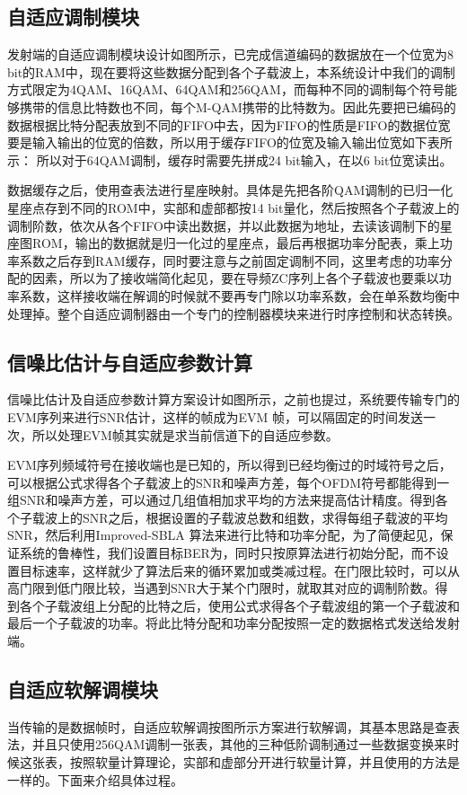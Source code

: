 \subsection{自适应调制模块}
发射端的自适应调制模块设计如图所示，已完成信道编码的数据放在一个位宽为8 bit的RAM中，现在要将这些数据分配到各个子载波上，本系统设计中我们的调制方式限定为4QAM、16QAM、64QAM和256QAM，而每种不同的调制每个符号能够携带的信息比特数也不同，每个M-QAM携带的比特数为。因此先要把已编码的数据根据比特分配表放到不同的FIFO中去，因为FIFO的性质是FIFO的数据位宽要是输入输出的位宽的倍数，所以用于缓存FIFO的位宽及输入输出位宽如下表所示：
所以对于64QAM调制，缓存时需要先拼成24 bit输入，在以6 bit位宽读出。

数据缓存之后，使用查表法进行星座映射。具体是先把各阶QAM调制的已归一化星座点存到不同的ROM中，实部和虚部都按14 bit量化，然后按照各个子载波上的调制阶数，依次从各个FIFO中读出数据，并以此数据为地址，去读该调制下的星座图ROM，输出的数据就是归一化过的星座点，最后再根据功率分配表，乘上功率系数之后存到RAM缓存，同时要注意与之前固定调制不同，这里考虑的功率分配的因素，所以为了接收端简化起见，要在导频ZC序列上各个子载波也要乘以功率系数，这样接收端在解调的时候就不要再专门除以功率系数，会在单系数均衡中处理掉。整个自适应调制器由一个专门的控制器模块来进行时序控制和状态转换。

\subsection{信噪比估计与自适应参数计算}
信噪比估计及自适应参数计算方案设计如图所示，之前也提过，系统要传输专门的EVM序列来进行SNR估计，这样的帧成为EVM 帧，可以隔固定的时间发送一次，所以处理EVM帧其实就是求当前信道下的自适应参数。

EVM序列频域符号在接收端也是已知的，所以得到已经均衡过的时域符号之后，可以根据公式求得各个子载波上的SNR和噪声方差，每个OFDM符号都能得到一组SNR和噪声方差，可以通过几组值相加求平均的方法来提高估计精度。得到各个子载波上的SNR之后，根据设置的子载波总数和组数，求得每组子载波的平均SNR，然后利用Improved-SBLA 算法来进行比特和功率分配，为了简便起见，保证系统的鲁棒性，我们设置目标BER为，同时只按原算法进行初始分配，而不设置目标速率，这样就少了算法后来的循环累加或类减过程。在门限比较时，可以从高门限到低门限比较，当遇到SNR大于某个门限时，就取其对应的调制阶数。得到各个子载波组上分配的比特之后，使用公式求得各个子载波组的第一个子载波和最后一个子载波的功率。将此比特分配和功率分配按照一定的数据格式发送给发射端。
\subsection{自适应软解调模块}
当传输的是数据帧时，自适应软解调按图所示方案进行软解调，其基本思路是查表法，并且只使用256QAM调制一张表，其他的三种低阶调制通过一些数据变换来时候这张表，按照软量计算理论，实部和虚部分开进行软量计算，并且使用的方法是一样的。下面来介绍具体过程。

